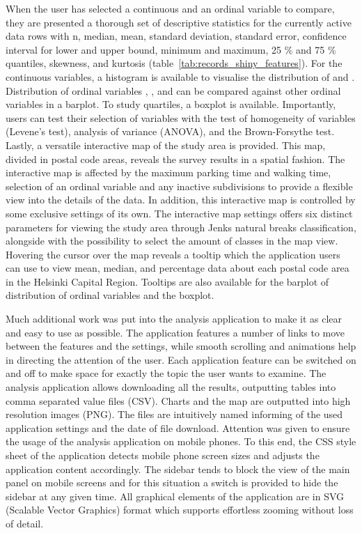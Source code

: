 When the user has selected a continuous and an ordinal variable to compare, they are presented a thorough set of descriptive statistics for the currently active data rows with n, median, mean, standard deviation, standard error, confidence interval for lower and upper bound, minimum and maximum, 25 \% and 75 \% quantiles, skewness, and kurtosis (table~\ref{tab:records_shiny_features}). For the continuous variables, a histogram is available to visualise the distribution of  and . Distribution of ordinal variables , , and  can be compared against other ordinal variables in a barplot. To study quartiles, a boxplot is available. Importantly, users can test their selection of variables with the test of homogeneity of variables (Levene's test), analysis of variance (ANOVA), and the Brown-Forsythe test. Lastly, a versatile interactive map of the study area is provided. This map, divided in postal code areas, reveals the survey results in a spatial fashion. The interactive map is affected by the maximum parking time and walking time, selection of an ordinal variable and any inactive subdivisions to provide a flexible view into the details of the data. In addition, this interactive map is controlled by some exclusive settings of its own. The interactive map settings offers six distinct parameters for viewing the study area through Jenks natural breaks classification, alongside with the possibility to select the amount of classes in the map view. Hovering the cursor over the map reveals a tooltip which the application users can use to view mean, median, and percentage data about each postal code area in the Helsinki Capital Region. Tooltips are also available for the barplot of distribution of ordinal variables and the boxplot.

Much additional work was put into the analysis application to make it as clear and easy to use as possible. The application features a number of links to move between the features and the settings, while smooth scrolling and animations help in directing the attention of the user. Each application feature can be switched on and off to make space for exactly the topic the user wants to examine. The analysis application allows downloading all the results, outputting tables into comma separated value files (CSV). Charts and the map are outputted into high resolution images (PNG). The files are intuitively named informing of the used application settings and the date of file download. Attention was given to ensure the usage of the analysis application on mobile phones. To this end, the CSS style sheet of the application detects mobile phone screen sizes and adjusts the application content accordingly. The sidebar tends to block the view of the main panel on mobile screens and for this situation a switch is provided to hide the sidebar at any given time. All graphical elements of the application are in SVG (Scalable Vector Graphics) format which supports effortless zooming without loss of detail.

